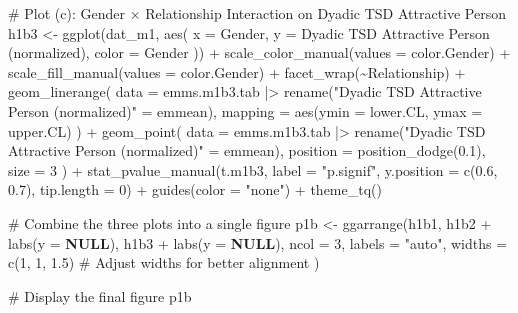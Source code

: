 \documentclass[
  bookmarksnumbered]{article}
\newenvironment{Shaded}{\begin{snugshade}}{\end{snugshade}}
\newcommand{\AttributeTok}[1]{\textcolor[rgb]{0.80,0.80,0.80}{#1}}
\newcommand{\CommentTok}[1]{\textcolor[rgb]{0.50,0.62,0.50}{#1}}
\newcommand{\ConstantTok}[1]{\textcolor[rgb]{0.86,0.64,0.64}{\textbf{#1}}}
\newcommand{\DecValTok}[1]{\textcolor[rgb]{0.86,0.86,0.80}{#1}}
\newcommand{\FloatTok}[1]{\textcolor[rgb]{0.75,0.75,0.82}{#1}}
\newcommand{\FunctionTok}[1]{\textcolor[rgb]{0.94,0.94,0.56}{#1}}
\newcommand{\NormalTok}[1]{\textcolor[rgb]{0.80,0.80,0.80}{#1}}
\newcommand{\OtherTok}[1]{\textcolor[rgb]{0.94,0.94,0.56}{#1}}
\newcommand{\SpecialCharTok}[1]{\textcolor[rgb]{0.86,0.64,0.64}{#1}}
\newcommand{\StringTok}[1]{\textcolor[rgb]{0.80,0.58,0.58}{#1}}
\begin{document}
\begin{Shaded}
\begin{Highlighting}[]
\CommentTok{\# Plot (c): Gender × Relationship Interaction on Dyadic TSD Attractive Person}
\NormalTok{h1b3 }\OtherTok{\textless{}{-}} \FunctionTok{ggplot}\NormalTok{(dat\_m1, }\FunctionTok{aes}\NormalTok{(}
  \AttributeTok{x =}\NormalTok{ Gender, }\AttributeTok{y =} \StringTok{\textasciigrave{}}\AttributeTok{Dyadic TSD Attractive Person (normalized)}\StringTok{\textasciigrave{}}\NormalTok{, }\AttributeTok{color =}\NormalTok{ Gender}
\NormalTok{)) }\SpecialCharTok{+}
  \FunctionTok{scale\_color\_manual}\NormalTok{(}\AttributeTok{values =}\NormalTok{ color.Gender) }\SpecialCharTok{+}
  \FunctionTok{scale\_fill\_manual}\NormalTok{(}\AttributeTok{values =}\NormalTok{ color.Gender) }\SpecialCharTok{+}
  \FunctionTok{facet\_wrap}\NormalTok{(}\SpecialCharTok{\textasciitilde{}}\NormalTok{Relationship) }\SpecialCharTok{+}
  \FunctionTok{geom\_linerange}\NormalTok{(}
    \AttributeTok{data =}\NormalTok{ emms.m1b3.tab }\SpecialCharTok{|\textgreater{}} \FunctionTok{rename}\NormalTok{(}\StringTok{"Dyadic TSD Attractive Person (normalized)"} \OtherTok{=}\NormalTok{ emmean),}
    \AttributeTok{mapping =} \FunctionTok{aes}\NormalTok{(}\AttributeTok{ymin =}\NormalTok{ lower.CL, }\AttributeTok{ymax =}\NormalTok{ upper.CL)}
\NormalTok{  ) }\SpecialCharTok{+}
  \FunctionTok{geom\_point}\NormalTok{(}
    \AttributeTok{data =}\NormalTok{ emms.m1b3.tab }\SpecialCharTok{|\textgreater{}} \FunctionTok{rename}\NormalTok{(}\StringTok{"Dyadic TSD Attractive Person (normalized)"} \OtherTok{=}\NormalTok{ emmean),}
    \AttributeTok{position =} \FunctionTok{position\_dodge}\NormalTok{(}\FloatTok{0.1}\NormalTok{), }\AttributeTok{size =} \DecValTok{3}
\NormalTok{  ) }\SpecialCharTok{+}
  \FunctionTok{stat\_pvalue\_manual}\NormalTok{(t.m1b3, }\AttributeTok{label =} \StringTok{"p.signif"}\NormalTok{, }\AttributeTok{y.position =} \FunctionTok{c}\NormalTok{(}\FloatTok{0.6}\NormalTok{, }\FloatTok{0.7}\NormalTok{), }\AttributeTok{tip.length =} \DecValTok{0}\NormalTok{) }\SpecialCharTok{+}
  \FunctionTok{guides}\NormalTok{(}\AttributeTok{color =} \StringTok{"none"}\NormalTok{) }\SpecialCharTok{+}
  \FunctionTok{theme\_tq}\NormalTok{()}

\CommentTok{\# Combine the three plots into a single figure}
\NormalTok{p1b }\OtherTok{\textless{}{-}} \FunctionTok{ggarrange}\NormalTok{(h1b1, h1b2 }\SpecialCharTok{+} \FunctionTok{labs}\NormalTok{(}\AttributeTok{y =} \ConstantTok{NULL}\NormalTok{), h1b3 }\SpecialCharTok{+} \FunctionTok{labs}\NormalTok{(}\AttributeTok{y =} \ConstantTok{NULL}\NormalTok{),}
  \AttributeTok{ncol =} \DecValTok{3}\NormalTok{, }\AttributeTok{labels =} \StringTok{"auto"}\NormalTok{, }\AttributeTok{widths =} \FunctionTok{c}\NormalTok{(}\DecValTok{1}\NormalTok{, }\DecValTok{1}\NormalTok{, }\FloatTok{1.5}\NormalTok{) }\CommentTok{\# Adjust widths for better alignment}
\NormalTok{)}

\CommentTok{\# Display the final figure}
\NormalTok{p1b}
\end{Highlighting}
\end{Shaded}
\end{document}
